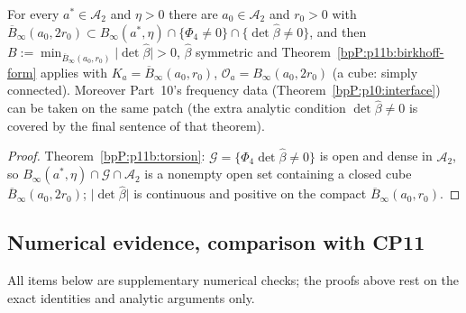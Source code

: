 \begin{corollary}\label{bpP:p11b:patch}
For every $a^*\in\mathcal A_2$ and $\eta>0$ there are $a_0\in\mathcal A_2$ and $r_0>0$ with $\overline B_\infty(a_0,2r_0)\subset B_\infty(a^*,\eta)\cap\{\Phi_4\ne0\}\cap\{\det\hat\beta\ne0\}$, and then $B:=\min_{\overline B_\infty(a_0,r_0)}\lvert\det\hat\beta\rvert>0$, $\hat\beta$ symmetric and Theorem~\ref{bpP:p11b:birkhoff-form} applies with $K_a=\overline B_\infty(a_0,r_0)$, $\mathcal O_a=B_\infty(a_0,2r_0)$ (a cube: simply connected). Moreover Part~10's frequency data (Theorem~\ref{bpP:p10:interface}) can be taken on the same patch (the extra analytic condition $\det\hat\beta\ne0$ is covered by the final sentence of that theorem).
\end{corollary}
\begin{proof}
Theorem~\ref{bpP:p11b:torsion}: $\mathcal G=\{\Phi_4\det\hat\beta\ne0\}$ is open and dense in $\mathcal A_2$, so $B_\infty(a^*,\eta)\cap\mathcal G\cap\mathcal A_2$ is a nonempty open set containing a closed cube $\overline B_\infty(a_0,2r_0)$; $\lvert\det\hat\beta\rvert$ is continuous and positive on the compact $\overline B_\infty(a_0,r_0)$.
\end{proof}

\subsection{Numerical evidence, comparison with CP11}\label{bpP:p11b:sec-num}

All items below are supplementary numerical checks; the proofs above rest on the exact identities and analytic arguments only.

